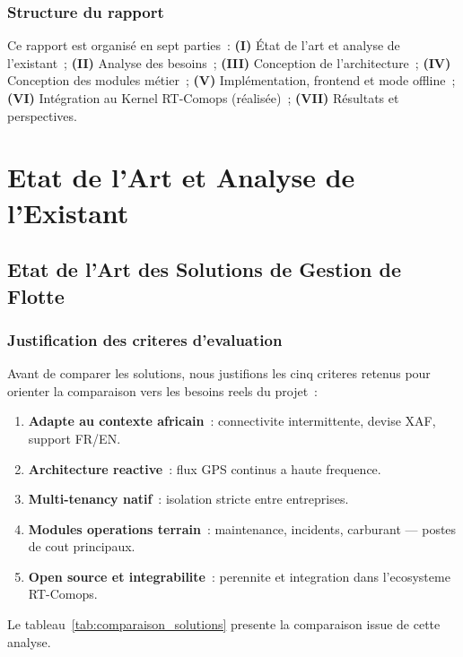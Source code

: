 \documentclass[12pt,a4paper]{report}
\begin{document}
\section*{Structure du rapport}
Ce rapport est organisé en sept parties~:
\textbf{(I)} État de l'art et analyse de l'existant~;
\textbf{(II)} Analyse des besoins~;
\textbf{(III)} Conception de l'architecture~;
\textbf{(IV)} Conception des modules métier~;
\textbf{(V)} Implémentation, frontend et mode offline~;
\textbf{(VI)} Intégration au Kernel RT-Comops (réalisée)~;
\textbf{(VII)} Résultats et perspectives.

\part{Etat de l'Art et Analyse de l'Existant}

\chapter{Etat de l'Art des Solutions de Gestion de Flotte}

\section{Justification des criteres d'evaluation}

Avant de comparer les solutions, nous justifions les cinq criteres retenus
pour orienter la comparaison vers les besoins reels du projet~:

\begin{enumerate}[leftmargin=2cm]
  \item \textbf{Adapte au contexte africain}~: connectivite intermittente,
        devise XAF, support FR/EN.
  \item \textbf{Architecture reactive}~: flux GPS continus a haute frequence.
  \item \textbf{Multi-tenancy natif}~: isolation stricte entre entreprises.
  \item \textbf{Modules operations terrain}~: maintenance, incidents,
        carburant --- postes de cout principaux.
  \item \textbf{Open source et integrabilite}~: perennite et integration
        dans l'ecosysteme RT-Comops.
\end{enumerate}

Le tableau~\ref{tab:comparaison_solutions} presente la comparaison
issue de cette analyse.
\end{document}
